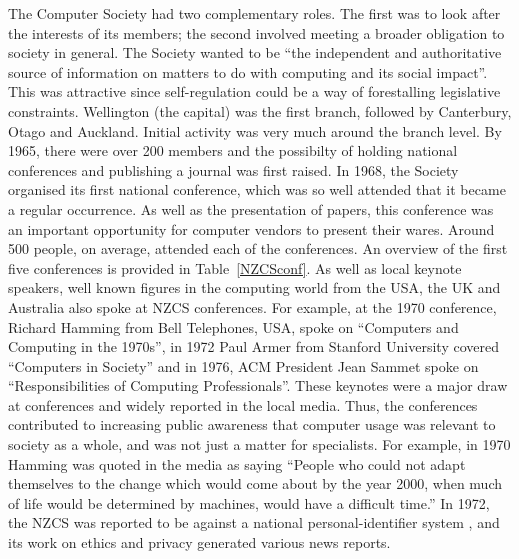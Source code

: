 \documentclass{IEEEcsmag}
\begin{document}
The Computer Society had two complementary roles. The first was to look after the interests of its members; the second involved meeting a broader obligation to society in general. The Society wanted to be “the independent and authoritative source of information on matters to do with computing and its social impact”. This was attractive since self-regulation could be a way of forestalling legislative constraints.
Wellington (the capital) was the first branch, followed by Canterbury, Otago and Auckland. Initial activity was very much around the branch level. By 1965, there were over 200 members and the possibilty of holding national conferences and publishing a journal was first raised. 
In 1968, the Society organised its first national conference, which was so well attended that it became a regular occurrence. As well as the presentation of papers, this conference was an important opportunity for computer vendors to present their wares. Around 500 people, on average, attended each of the conferences. An overview of the first five conferences is provided in Table~\ref{NZCSconf}. As well as local keynote speakers, well known figures in the computing world from the USA, the UK and Australia also spoke at NZCS conferences. For example, at the 1970 conference, Richard Hamming from Bell Telephones, USA, spoke on “Computers and Computing in the 1970s”, in 1972 Paul Armer from Stanford University covered “Computers in Society” and in 1976, ACM President Jean Sammet spoke on “Responsibilities of Computing Professionals”. These keynotes were a major draw at conferences and widely reported in the local media.
Thus, the conferences contributed to increasing public awareness that computer usage was relevant to society as a whole, and was not just  a matter for specialists. For example, in 1970 Hamming was quoted in the media as saying “People who could not adapt themselves to the change which would come about by the year 2000, when much of life would be determined by machines, would have a difficult time.” \cite{Press-Hamming} In 1972, the NZCS was reported to be against a national personal-identifier system \cite{Press-Nat-ID}, and its work on ethics and privacy generated various news reports.
\end{document}
